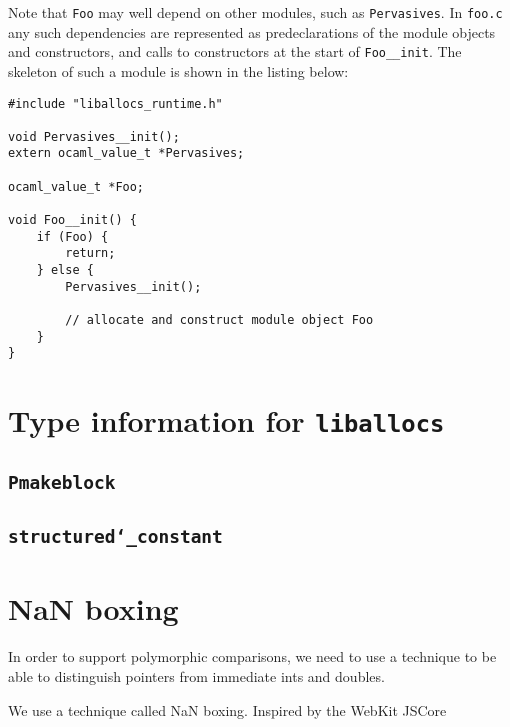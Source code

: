 \documentclass[12pt,a4paper,twoside,openright]{report}
\begin{document}
Note that \lstinline!Foo! may well depend on other modules, such as
\lstinline!Pervasives!. In \lstinline!foo.c! any such dependencies are
represented as predeclarations of the module objects and constructors, and
calls to constructors at the start of \lstinline!Foo__init!. The skeleton of
such a module is shown in the listing below:

\begin{lstlisting}
#include "liballocs_runtime.h"

void Pervasives__init();
extern ocaml_value_t *Pervasives;

ocaml_value_t *Foo;

void Foo__init() {
    if (Foo) {
        return;
    } else {
        Pervasives__init();

        // allocate and construct module object Foo
    }
}
\end{lstlisting}

\section{Type information for \texttt{liballocs}}\label{type-information-for-liballocs}

\subsection{\texttt{Pmakeblock}}

\subsection{\texttt{structured\char`_constant}}

\section{NaN boxing}\label{nan-boxing}

In order to support polymorphic comparisons, we need to use a technique to be
able to distinguish pointers from immediate ints and doubles.

We use a technique called NaN boxing. Inspired by the WebKit JSCore
\end{document}
